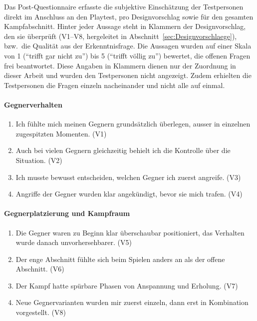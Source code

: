 \documentclass[../Main.tex]{subfiles}
\begin{document}
Das Post-Questionnaire erfasste die subjektive Einschätzung der Testpersonen direkt im Anschluss an den Playtest, pro Designvorschlag sowie für den gesamten Kampfabschnitt. Hinter jeder Aussage steht in Klammern der Designvorschlag, den sie überprüft (V1--V8, hergeleitet in Abschnitt~\ref{sec:Designvorschlaege}), bzw.\ die Qualität aus der Erkenntnisfrage. Die Aussagen wurden auf einer Skala von 1 (\enquote{trifft gar nicht zu}) bis 5 (\enquote{trifft völlig zu}) bewertet, die offenen Fragen frei beantwortet. Diese Angaben in Klammern dienen nur der Zuordnung in dieser Arbeit und wurden den Testpersonen nicht angezeigt. Zudem erhielten die Testpersonen die Fragen einzeln nacheinander und nicht alle auf einmal.

\paragraph{Gegnerverhalten}
\begin{enumerate}[label=\textbf{Q\arabic*}, leftmargin=1.5cm, itemsep=0.5em]
    \item Ich fühlte mich meinen Gegnern grundsätzlich überlegen, ausser in einzelnen zugespitzten Momenten. \hfill (V1)
    \item Auch bei vielen Gegnern gleichzeitig behielt ich die Kontrolle über die Situation. \hfill (V2)
    \item Ich musste bewusst entscheiden, welchen Gegner ich zuerst angreife. \hfill (V3)
    \item Angriffe der Gegner wurden klar angekündigt, bevor sie mich trafen. \hfill (V4)
\end{enumerate}

\paragraph{Gegnerplatzierung und Kampfraum}
\begin{enumerate}[label=\textbf{Q\arabic*}, leftmargin=1.5cm, itemsep=0.5em, resume]
    \item Die Gegner waren zu Beginn klar überschaubar positioniert, das Verhalten wurde danach unvorhersehbarer. \hfill (V5)
    \item Der enge Abschnitt fühlte sich beim Spielen anders an als der offene Abschnitt. \hfill (V6)
    \item Der Kampf hatte spürbare Phasen von Anspannung und Erholung. \hfill (V7)
    \item Neue Gegnervarianten wurden mir zuerst einzeln, dann erst in Kombination vorgestellt. \hfill (V8)
\end{enumerate}
\end{document}
